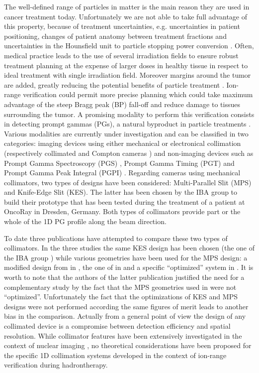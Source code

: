 \documentclass[a4paper,english]{article}
\begin{document}
The well-defined range of particles in matter is the main reason they are used in cancer treatment today. Unfortunately we are not able to take full advantage of this property, because of treatment uncertainties, e.g. uncertainties in patient positioning, changes of patient anatomy between treatment fractions and uncertainties in the Hounsfield unit to particle stopping power conversion \citep{Paganetti2012}. Often, medical practice leads to the use of several irradiation fields to ensure robust treatment planning at the expense of larger doses in healthy tissue in respect to ideal treatment with single irradiation field. Moreover margins around the tumor are added, greatly reducing the potential benefits of particle treatment \citep{Knopf2013}. Ion-range verification could permit more precise planning which could take maximum advantage of the steep Bragg peak (BP) fall-off and reduce damage to tissues surrounding the tumor. A promising modality to perform this verification consists in detecting prompt gammas (PGs), a natural byproduct in particle treatments \citep{Krimmer2017a, Parodi2018}. Various modalities are currently under investigation and can be classified in two categories: imaging devices using either mechanical or electronical collimation (respectively collimated \citep{Perali2014, Min2012, Pinto2014a} and Compton cameras \citep{Krimmer2015,Kurosawa2012,Thirolf2016,Polf2015,Llosa2016}) and non-imaging devices such as Prompt Gamma Spectroscopy (PGS) \citep{Hueso-Gonzalez2016}, Prompt Gamma Timing (PGT) \citep{Pausch2016} and Prompt Gamma Peak Integral (PGPI) \citep{Krimmer2017}. Regarding cameras using mechanical collimators, two types of designs have been considered: Multi-Parallel Slit (MPS) and Knife-Edge Slit (KES). The latter has been chosen by the IBA group to build their prototype that has been tested during the treatment of a patient at OncoRay in Dresden, Germany. Both types of collimators provide part or the whole of the 1D PG profile along the beam direction.

To date three publications \citep{Smeets2016, Lin2017, Park2017} have attempted to compare these two types of collimators. In the three studies the same KES design has been chosen (the one of the IBA group \citep{Perali2014}) while various geometries have been used for the MPS design: a modified design from \cite{Pinto2014a} in \citep{Smeets2016}, the one of \cite{Gueth2013} in \citep{Lin2017} and a specific \enquote{optimized} system in \citep{Park2017}. It is worth to note that the authors of the latter publication justified the need for a complementary study by the fact that the MPS geometries used in \cite{Smeets2016, Lin2017} were not \enquote{optimized}. 
Unfortunately the fact that the optimizations of KES and MPS designs were not performed according the same figures of merit leads to another bias in the comparison. Actually from a general point of view the design of any collimated device is a compromise between detection efficiency and spatial resolution. While collimator features have been extensively investigated in the context of nuclear imaging \citep{Gunter2004}, no theoretical considerations have been proposed for the specific 1D collimation systems developed in the context of ion-range verification during hadrontherapy.
\end{document}
